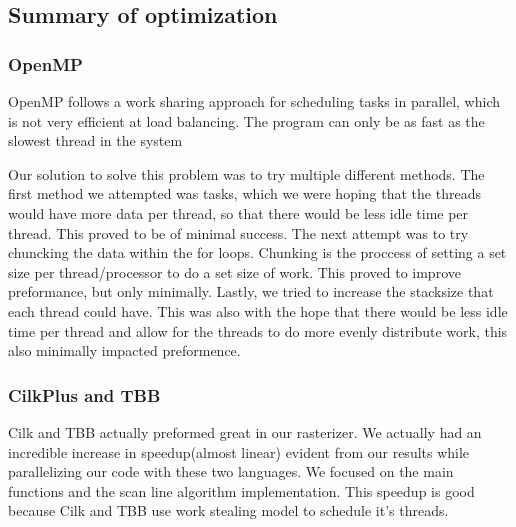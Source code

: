 \subsection*{Summary of optimization}

\subsubsection*{OpenMP}
OpenMP follows a work sharing approach for scheduling tasks in parallel, which is not very efficient at load balancing. The program can only be as fast as the slowest thread in the system

Our solution to solve this problem was to try multiple different methods. The first method we attempted was tasks, which we were hoping that the threads would have more data per thread, so that there would be less idle time per thread. This proved to be of minimal success. The next attempt was to try chuncking the data within the for loops. Chunking is the proccess of setting a set size per thread/processor to do a set size of work. This proved to improve preformance, but only minimally. Lastly, we tried to increase the stacksize that each thread could have. This was also with the hope that there would be less idle time per thread and allow for the threads to do more evenly distribute work, this also minimally impacted preformence. 

\subsubsection{CilkPlus and TBB}
Cilk and TBB actually preformed great in our rasterizer. We actually had an incredible increase in speedup(almost linear) evident from our results while parallelizing our code with these two languages. We focused on the main functions and the scan line algorithm implementation. This speedup is good because Cilk and TBB use work stealing model to schedule it's threads.

